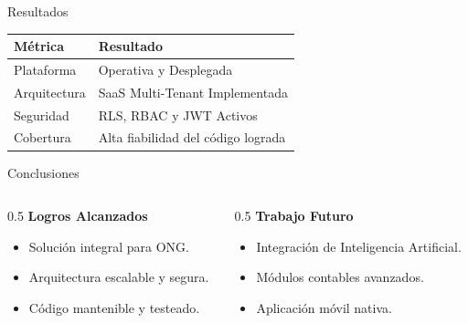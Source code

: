 \documentclass[aspectratio=169]{beamer}
\begin{document}
\begin{frame}{Resultados}
    \centering
    \renewcommand{\arraystretch}{1.6}
    \begin{tabular}{@{}ll@{}}
        \toprule
        \textbf{Métrica} & \textbf{Resultado} \\
        \midrule
        \textcolor{AzulMedio}{Plataforma} & Operativa y Desplegada \\
        \textcolor{AzulMedio}{Arquitectura} & SaaS Multi-Tenant Implementada \\
        \textcolor{AzulMedio}{Seguridad} & RLS, RBAC y JWT Activos \\
        \textcolor{AzulMedio}{Cobertura} & Alta fiabilidad del código lograda \\
        \bottomrule
    \end{tabular}
\end{frame}

\begin{frame}{Conclusiones}
    \begin{columns}[T]
        \begin{column}{0.5\textwidth}
            \textcolor{AzulOscuro}{\textbf{Logros Alcanzados}}
            \vspace{0.3cm}
            \begin{itemize}
                \item Solución integral para ONG.
                \item Arquitectura escalable y segura.
                \item Código mantenible y testeado.
            \end{itemize}
        \end{column}
        \begin{column}{0.5\textwidth}
            \textcolor{AzulOscuro}{\textbf{Trabajo Futuro}}
            \vspace{0.3cm}
            \begin{itemize}
                \item Integración de Inteligencia Artificial.
                \item Módulos contables avanzados.
                \item Aplicación móvil nativa.
            \end{itemize}
        \end{column}
    \end{columns}
\end{frame}
\end{document}
